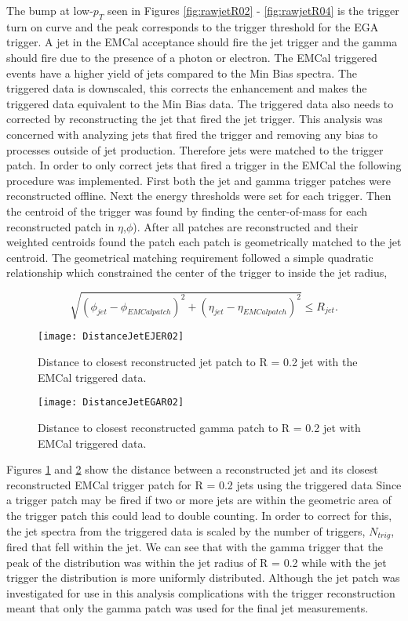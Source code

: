 The bump at low-$p_{T}$ seen in Figures \ref{fig:rawjetR02} - \ref{fig:rawjetR04} is the trigger turn on curve and the peak corresponds to the trigger threshold for the EGA trigger.  A jet in the EMCal acceptance should fire the jet trigger and the gamma should fire due to the presence of a photon or electron. The EMCal triggered events have a higher yield of jets compared to the Min Bias spectra.  The triggered data is downscaled, this corrects the enhancement and makes the triggered data equivalent to the Min Bias data.  The triggered data also needs to corrected by reconstructing the jet that fired the jet trigger.
 This analysis was concerned with analyzing jets that fired the trigger and removing any bias to processes outside of jet production. Therefore jets were matched to the trigger patch.  In order to only correct jets that fired a trigger in the EMCal the following procedure was implemented.  First both the jet and gamma trigger patches were reconstructed offline.  Next the energy thresholds were set for each trigger.  Then the centroid of the trigger was found by finding the center-of-mass for each reconstructed patch in $\eta$,$\phi$).  After all patches are reconstructed and their weighted centroids found the patch each patch is geometrically matched to the jet centroid.  The geometrical matching requirement followed a simple quadratic relationship which constrained the center of the trigger to inside the jet radius,

\begin{equation}
\sqrt{ ( \phi_{jet} - \phi_{EMCal patch} )^{2} + ( \eta_{jet} - \eta_{EMCal patch} )^{2}}  \leq R_{jet} .
\label{eq:triggermatch}
\end{equation}

\begin{figure}[h]
\texttt{[image: DistanceJetEJER02]}
\centering
\caption{Distance to closest reconstructed jet patch to R = 0.2 jet with the EMCal triggered data.}
\label{fig:DisJetEJE}
\end{figure}

\begin{figure}[h]
\texttt{[image: DistanceJetEGAR02]}
\centering
\caption{Distance to closest reconstructed gamma patch to R = 0.2 jet with EMCal triggered data.}
\label{fig:DisJetEGA}
\end{figure}

\noindent
Figures \ref{fig:DisJetEJE} and \ref{fig:DisJetEGA} show the distance between a reconstructed jet and its closest reconstructed EMCal trigger patch for R = 0.2 jets using the triggered data  Since a trigger patch may be fired if two or more jets are within the geometric area of the trigger patch this could lead to double counting.  In order to correct for this, the jet spectra from the triggered data is scaled by the number of triggers, $N_{trig}$, fired that fell within the jet.  We can see that with the gamma trigger that the peak of the distribution was within the jet radius of R = 0.2 while with the jet trigger the distribution is more uniformly distributed.  Although the jet patch was investigated for use in this analysis complications with the trigger reconstruction meant that only the gamma patch was used for the final jet measurements.

